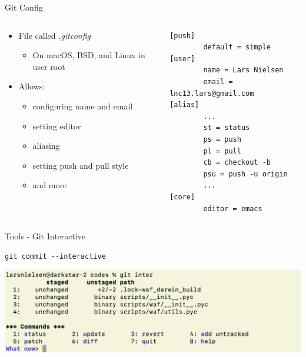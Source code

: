 \documentclass[table,svgnames,aspectratio=169]{beamer}
\begin{document}
\begin{frame}[fragile,label={sec:orgb023bb9}]{Git Config}
 \begin{columns}
\begin{column}{.5\columnwidth}
\begin{itemize}
\item File called \emph{.gitconfig}
\begin{itemize}
\item On macOS, BSD, and Linux in user root
\end{itemize}
\item Allows: 
\begin{itemize}
\item configuring name and email
\item setting editor
\item aliasing
\item setting push and pull style
\item and more
\end{itemize}
\end{itemize}
\end{column}
\begin{column}{.5\columnwidth}
\lstset{language=bash,label= ,caption= ,captionpos=b,numbers=none}
\begin{lstlisting}
[push]
        default = simple
[user]
        name = Lars Nielsen
        email = lnc13.lars@gmail.com
[alias]
        ...
        st = status
        ps = push
        pl = pull
        cb = checkout -b
        psu = push -u origin
        ... 
[core]
        editor = emacs

\end{lstlisting}
\end{column}
\end{columns}
\end{frame}
\begin{frame}[fragile,label={sec:org30fd9bd}]{Tools - Git Interactive}
 \lstset{language=bash,label= ,caption= ,captionpos=b,numbers=none}
\begin{lstlisting}
git commit --interactive
\end{lstlisting}

\begin{center}
\includegraphics[width=\textwidth]{graphics/interactive.png}
\end{center}
\end{frame}
\end{document}
